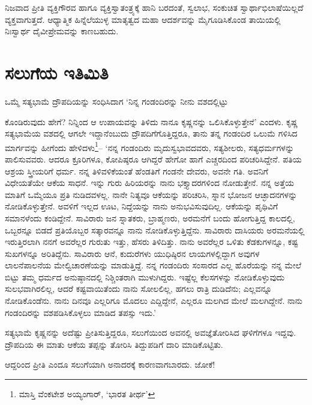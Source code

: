 ನಿಜವಾದ ಪ್ರೀತಿ ವ್ಯಕ್ತಿಗೌರವ ಹಾಗೂ ವ್ಯಕ್ತಿಸ್ವಾತಂತ್ರ್ಯಕ್ಕೆ ಹಾನಿ ಬರದಂತೆ, ಸ್ವಲಾಭ, ಸಂಕುಚಿತ ಸ್ವಾರ್ಥಾಭಿಲಾಷೆಯಿಲ್ಲದೆ ವ್ಯಕ್ತವಾಗುತ್ತದೆ. ಆಧ್ಯಾತ್ಮಿಕ ಹಿನ್ನೆಲೆಯುಳ್ಳ ಮಾತೃತ್ವದ ಮಹಾ ಆದರ್ಶವನ್ನು ಮೈಗೂಡಿಸಿಕೊಂಡ ತಾಯಿಯಲ್ಲಿ ನಿಃಸ್ವಾರ್ಥ ದೈವೀಪ್ರೇಮವನ್ನು ಕಾಣಬಹುದು.


\section*{ಸಲುಗೆಯ ಇತಿಮಿತಿ}


{\parfillskip=0pt ಒಮ್ಮೆ ಸತ್ಯಭಾಮೆ ದ್ರೌಪದಿಯನ್ನು ಸಂಧಿಸಿದಾಗ ‘ನಿನ್ನ ಗಂಡಂದಿರನ್ನು ನೀನು ವಶದಲ್ಲಿಟ್ಟು\par}\newpage\noindent ಕೊಂಡಿರುವುದು ಹೇಗೆ? ನಿನ್ನಿಂದ ಆ ಉಪಾಯವನ್ನು ತಿಳಿದು ನಾನೂ ಕೃಷ್ಣನನ್ನು ಒಲಿಸಿಕೊಳ್ಳುತ್ತೇನೆ’ ಎಂದಳು. ಕೃಷ್ಣ ಸತ್ಯಭಾಮೆಯ ವಶದಲ್ಲಿ ಆಗಲೇ ಇದ್ದಾನೆಂಬುದು ದ್ರೌಪದಿಗೆ\break ಗೊತ್ತಿದ್ದರೂ, ತಾನು ತನ್ನ ಗಂಡಂದಿರ ಒಲುಮೆ ಗಳಿಸಿದ ಮಾರ್ಗವನ್ನು ಹೀಗೆಂದು ಹೇಳಿದಳು\footnote{ ಮಾಸ್ತಿ ವೆಂಕಟೇಶ ಅಯ್ಯಂಗಾರ್, ‘ಭಾರತ ತೀರ್ಥ’}– ‘ನನ್ನ ಗಂಡಂದಿರು ಮೃದುಸ್ವಭಾವದವರು, ಸತ್ಯಶೀಲರು, ಸತ್ಯಧರ್ಮಗಳನ್ನು ಪಾಲಿಸುವವರು. ಆದರೂ ಕ್ರೂರಿಗಳೂ, ಕೋಪಿಷ್ಠರೂ ಆಗಿದ್ದರೆ ಹೇಗೋ ಹಾಗೆ ಎಚ್ಚರದಿಂದ ಪರಿಚರಿಸಿದ್ದೇನೆ. ಪತಿಯ ಆಶ್ರಯ ಸ್ತ್ರೀಯರಿಗೆ ಧರ್ಮ. ನನ್ನ ತಿಳಿವಳಿಕೆಯಂತೆ ಹೆಂಡತಿಗೆ ಗಂಡನೇ ದೇವರು, ಅವನೇ ಗತಿ. ಅವನಿಗೆ ವಿಧೇಯತೆಯೇ ಆಕೆಯ ಸಾಧನೆ. ಇನ್ನು ಗುರು ಹಿರಿಯರನ್ನು ನಾನು ಭಕ್ತ್ಯಾದರಗಳಿಂದ ನೋಡುತ್ತೇನೆ. ನನ್ನ ಅತ್ತೆಯ ಮಾತಿಗೆ ಒಮ್ಮೆಯೂ ಪ್ರತಿ ನುಡಿದವಳಲ್ಲ. ನಾನೇ ನಿತ್ಯವೂ ಆಕೆಯನ್ನು ಪರಿಚರಿಸಿ, ಸ್ನಾನ ಭೋಜನ ಆಚ್ಛಾದನಗಳನ್ನು ನೋಡಿಕೊಳ್ಳುತ್ತೇನೆ. ಅವಳಿಗೆ ಇಲ್ಲದ ಊಟ, ನಿದ್ದೆಯನ್ನು ನಾನು ಅನುಭವಿಸುವುದಿಲ್ಲ. ಆಕೆಯನ್ನು ಪೃಥಿವಿಗೆ ಸಮಾನಳೆಂದು ಕಂಡಿದ್ದೇನೆ. ಸಾವಿರಾರು ಜನ ಸ್ನಾತಕರು, ಬ್ರಾಹ್ಮಣರು, ಅರಮನೆಗೆ ಬಂದು ಹೋಗುತ್ತಿದ್ದ ಕಾಲದಲ್ಲಿ, ಒಬ್ಬರನ್ನೂ ಬಿಡದೆ ಪ್ರತಿಯೊಬ್ಬರ ಸತ್ಕಾರವನ್ನೂ ನಾನು ನೋಡಿಕೊಳ್ಳುತ್ತಿದ್ದೆನು. ಸಾವಿರಾರು ದಾಸಿಯರು ಅರಮನೆಯಲ್ಲಿ ಇರುತ್ತಿರಲಾಗಿ ನನಗೆ ಅವರೆಲ್ಲರ ಗುರುತು ಇತ್ತು, ಹೆಸರು ತಿಳಿದಿತ್ತು. ನಾನು ಅವರೆಲ್ಲರ ಒಳಿತು ಕೆಡಕುಗಳನ್ನೂ, ಕಷ್ಟ ಸುಖಗಳನ್ನೂ ಅರಿತಿದ್ದೆನು. ಸಾವಿರಾರು ಆನೆ, ಕುದುರೆಗಳು ಯುಧಿಷ್ಠಿರನ ಲಾಯಗಳಲ್ಲಿದ್ದಾಗ ಅವುಗಳ ಲಾಲನೆಪಾಲನೆಯ ಮೇಲ್ವಿಚಾರಣೆಯನ್ನು ಮಾಡುತ್ತಿದ್ದೆ. ನನ್ನ ಗಂಡಂದಿರು ಸಂಸಾರದ ಎಲ್ಲ ಹೊರೆಯನ್ನು ನನ್ನ ಮೇಲೆ ಬಿಟ್ಟು ತಮ್ಮ ಧರ್ಮದ ಅನುಷ್ಠಾನದಲ್ಲಿ ನಿಶ್ಚಿಂತರಾಗಿ ಮುಳುಗಿದ್ದರು. ಇಷ್ಟೆಲ್ಲ ಕೆಲಸಗಳನ್ನು ನೋಡಿಕೊಳ್ಳುವುದು ಸುಲಭವಾಗಿರಲಿಲ್ಲ, ಆದರೆ ಕಷ್ಟವಾಯಿತೆಂದು ನಾನು ಸೋಲಲಿಲ್ಲ, ಹಗಲು ರಾತ್ರಿ ದುಡಿದೆನು; ಎಲ್ಲವನ್ನೂ ನೋಡಿಕೊಂಡೆನು. ನಾನು ದಿನವೂ ಎಲ್ಲರಿಗೂ ಮೊದಲು ಎದ್ದಿದ್ದೇನೆ, ಎಲ್ಲರೂ ಮಲಗಿದ ಮೇಲೆ ಮಲಗಿದ್ದೇನೆ. ನಾನು ಗಂಡಂದಿರನ್ನು ವಶಪಡಿಸಿಕೊಳ್ಳಲು ಮಾಡಿದ ತಪಸ್ಸು ಇದು.’

ಸತ್ಯಭಾಮೆ ಕೃಷ್ಣನನ್ನು ಅದೆಷ್ಟು ಪ್ರೀತಿಸುತ್ತಿದ್ದರೂ, ಸಲುಗೆಯಿಂದ ಅವನಲ್ಲಿ ಅವಜ್ಞೆ\break ತೋರಿಸಿದ ಘಳಿಗೆಗಳೂ ಇದ್ದವು. ದ್ರೌಪದಿಯ ಈ ಮಾತು ಆಕೆಯ ತಪ್ಪನ್ನು ತೋರಿಸಿ ತಿದ್ದುಪಡಿಗೆ ದಾರಿ ಮಾಡಿಕೊಟ್ಟಿತು.

ಆದ್ದರಿಂದ ಪ್ರೀತಿ ಎಂದೂ ಸಲುಗೆಯಾಗಿ ಅನಾದರಕ್ಕೆ ಕಾರಣವಾಗಬಾರದು. ಜೋಕೆ!


